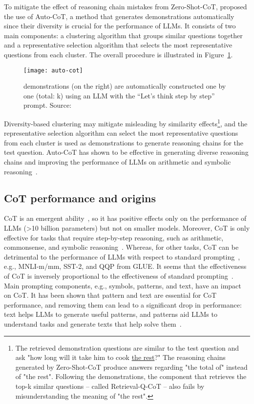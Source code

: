 To mitigate the effect of reasoning chain mistakes from Zero-Shot-CoT, \textcite{zhang2022automatic} proposed the use of Auto-CoT, a method that generates demonstrations automatically since their diversity is crucial for the performance of LLMs.
It consists of two main components: a clustering algorithm that groups similar questions together and a representative selection algorithm that selects the most representative questions from each cluster.
The overall procedure is illustrated in Figure~\ref{fig:auto-cot}.
\begin{figure}[h!]
	\centering
	\texttt{[image: auto-cot]}
	\caption{demonstrations (on the right) are automatically constructed one by one (total: k) using an LLM with the “Let’s think step by step” prompt. Source: \textcite{zhang2022automatic}}
	\label{fig:auto-cot}
\end{figure}
Diversity-based clustering may mitigate misleading by similarity effects\footnote{The retrieved demonstration questions are similar to the test question and ask "how long will it take him to cook \underline{the rest}?" The reasoning chains generated by Zero-Shot-CoT produce answers regarding "the total of" instead of "the rest". Following the demonstrations, the component that retrieves the top-k similar questions -- called Retrieval-Q-CoT -- also fails by misunderstanding the meaning of "the rest".}, and the representative selection algorithm can select the most representative questions from each cluster is used as demonstrations to generate reasoning chains for the test question.
Auto-CoT has shown to be effective in generating diverse reasoning chains and improving the performance of LLMs on arithmetic and symbolic reasoning~\cite{zhang2022automatic}.

\subsection{CoT performance and origins}
\label{subsec:cot-performance}

CoT is an emergent ability~\cite{wei2022emergent}, so it has positive effects only on the performance of LLMs (\textgreater 10 billion parameters) but not on smaller models.
Moreover, CoT is only effective for tasks that require step-by-step reasoning, such as arithmetic, commonsense, and symbolic reasoning~\cite{wei2022chain, miao2021diverse, talmor2019commonsenseqa}.
Whereas, for other tasks, CoT can be detrimental to the performance of LLMs with respect to standard prompting~\cite{wang2022rationale}, e.g., MNLI-m/mm, SST-2, and QQP from GLUE\cite{wang2018glue}.
It seems that the effectiveness of CoT is inversely proportional to the effectiveness of standard prompting~\cite{wei2022chain}.
Main prompting components, e.g., symbols, patterns, and text, have an impact on CoT.
It has been shown that pattern and text are essential for CoT performance, and removing them can lead to a significant drop in performance: text helps LLMs
to generate useful patterns, and patterns aid LLMs to understand tasks and generate texts that help solve them~\cite{madaan2022text}.

